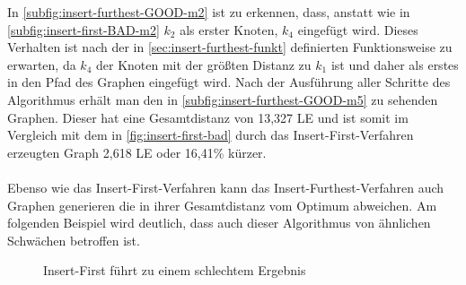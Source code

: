 In \vref{subfig:insert-furthest-GOOD-m2} ist zu erkennen, dass, anstatt wie in \vref{subfig:insert-first-BAD-m2} $k_2$ als erster Knoten, $k_4$ eingefügt wird.
Dieses Verhalten ist nach der in \vref{sec:insert-furthest-funkt} definierten Funktionsweise zu erwarten, da $k_4$ der Knoten mit der größten Distanz zu $k_1$ ist und daher als erstes in den Pfad des Graphen eingefügt wird.
Nach der Ausführung aller Schritte des Algorithmus erhält man den in \vref{subfig:insert-furthest-GOOD-m5} zu sehenden Graphen.
Dieser hat eine Gesamtdistanz von 13,327 \ac{LE} und ist somit im Vergleich mit dem in \vref{fig:insert-first-bad} durch das Insert-First-Verfahren erzeugten Graph 2,618 \ac{LE} oder 16,41\% kürzer.
\\\\
Ebenso wie das Insert-First-Verfahren kann das Insert-Furthest-Verfahren auch Graphen generieren die in ihrer Gesamtdistanz vom Optimum abweichen. Am folgenden Beispiel wird deutlich, dass auch dieser Algorithmus von ähnlichen Schwächen betroffen ist.
\begin{figure}[H]
    \begin{center}
        \hfil
        \caption{Insert-First führt zu einem schlechtem Ergebnis}
        \label{fig:insert-furthest-bad}
    \end{center}
\end{figure}
